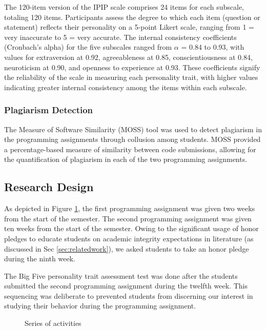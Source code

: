 The 120-item version of the IPIP scale comprises 24 items for each subscale, totaling 120 items. Participants assess the degree to which each item (question or statement) reflects their personality on a 5-point Likert scale, ranging from 1 = very inaccurate to 5 = very accurate. The internal consistency coefficients (Cronbach's alpha) for the five subscales ranged from \begin{math} \alpha \end{math} = 0.84 to 0.93, with values for extraversion at 0.92, agreeableness at 0.85, conscientiousness at 0.84, neuroticism at 0.90, and openness to experience at 0.93. These coefficients signify the reliability of the scale in measuring each personality trait, with higher values indicating greater internal consistency among the items within each subscale.

\subsubsection{Plagiarism Detection}

The Measure of Software Similarity (MOSS) tool \cite{MOSS} was used to detect plagiarism in the programming assignments through collusion among students. MOSS provided a percentage-based measure of similarity between code submissions, allowing for the quantification of plagiarism in each of the two programming assignments.

\subsection{Research Design}

As depicted in Figure \ref{fig:activityTimeline}, the first programming assignment was given two weeks from the start of the semester. The second programming assignment was given ten weeks from the start of the semester. Owing to the significant usage of honor pledges to educate students on academic integrity expectations in literature (as discussed in Sec \ref{sec:relatedwork}), we asked students to take an honor pledge during the ninth week. 

The Big Five personality trait assessment test was done after the students submitted the second programming assignment during the twelfth week. This sequencing was deliberate to prevented students from discerning our interest in studying their behavior during the programming assignment.

\begin{figure}[H]
  \centering
  \vspace{-8pt}
  \caption{Series of activities}
  \label{fig:activityTimeline} \vspace{-8pt}
\end{figure}

